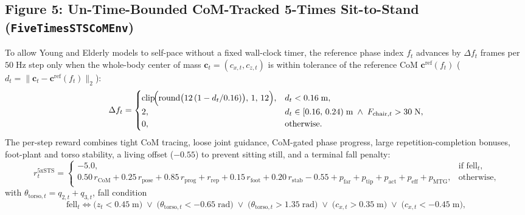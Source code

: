 \subsection*{Figure 5: Un-Time-Bounded CoM-Tracked 5-Times Sit-to-Stand (\texttt{FiveTimesSTSCoMEnv})}

To allow Young and Elderly models to self-pace without a fixed wall-clock timer, the reference phase index $f_t$ advances by $\Delta f_t$ frames per $50\;\mathrm{Hz}$ step only when the whole-body center of mass $\mathbf{c}_t = (c_{x,t}, c_{z,t})$ is within tolerance of the reference CoM $\mathbf{c}^{\mathrm{ref}}(f_t)$ ($d_t = \lVert \mathbf{c}_t - \mathbf{c}^{\mathrm{ref}}(f_t) \rVert_2$):
\begin{equation}
\Delta f_t =
\begin{cases}
\mathrm{clip}\!\Bigl(\mathrm{round}\bigl(12\,(1 - d_t / 0.16)\bigr),\, 1,\, 12\Bigr), & d_t < 0.16\;\mathrm{m}, \\
2, & d_t \in [0.16,\, 0.24)\;\mathrm{m} \;\land\; F_{\mathrm{chair},t} > 30\;\mathrm{N}, \\
0, & \text{otherwise}.
\end{cases}
\end{equation}
The per-step reward combines tight CoM tracing, loose joint guidance, CoM-gated phase progress, large repetition-completion bonuses, foot-plant and torso stability, a living offset ($-0.55$) to prevent sitting still, and a terminal fall penalty:
\begin{equation}
r_t^{\mathrm{5xSTS}} =
\begin{cases}
-5.0, & \text{if } \mathrm{fell}_t, \\[6pt]
0.50\,r_{\mathrm{CoM}} + 0.25\,r_{\mathrm{pose}} + 0.85\,r_{\mathrm{prog}} + r_{\mathrm{rep}} + 0.15\,r_{\mathrm{foot}} + 0.20\,r_{\mathrm{stab}} - 0.55 + p_{\mathrm{far}} + p_{\mathrm{tip}} + p_{\mathrm{act}} + p_{\mathrm{eff}} + p_{\mathrm{MTG}}, & \text{otherwise},
\end{cases}
\end{equation}
with $\theta_{\mathrm{torso},t} = q_{2,t} + q_{3,t}$, fall condition
\begin{equation}
\mathrm{fell}_t \iff \bigl(z_t < 0.45\;\mathrm{m}\bigr) \;\lor\; \bigl(\theta_{\mathrm{torso},t} < -0.65\;\mathrm{rad}\bigr) \;\lor\; \bigl(\theta_{\mathrm{torso},t} > 1.35\;\mathrm{rad}\bigr) \;\lor\; \bigl(c_{x,t} > 0.35\;\mathrm{m}\bigr) \;\lor\; \bigl(c_{x,t} < -0.45\;\mathrm{m}\bigr),
\end{equation}
